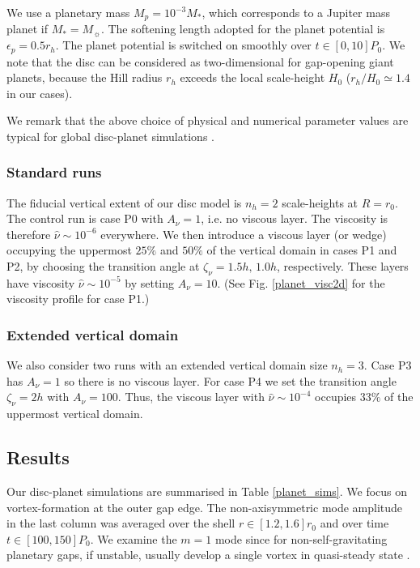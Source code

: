 We use a planetary mass 
$M_p=10^{-3}M_*$, which corresponds to a Jupiter mass planet if
$M_*=M_{\sun}$. The softening length adopted for the planet potential is
$\epsilon_p=0.5r_h$. The planet potential is switched on 
smoothly over $t\in[0,10]P_0$. We note that the disc can be considered
as two-dimensional for gap-opening giant planets, because the Hill
radius $r_h$ exceeds the local scale-height $H_0$ ($r_h/H_0\simeq1.4$
in our cases).   

We remark that the above choice of physical and numerical parameter
values are typical for global disc-planet simulations
\citep[e.g.][]{valborro06,mignone12}.  


\subsubsection{Standard runs} 
The fiducial vertical extent of our disc model is $n_h=2$
scale-heights at $R=r_0$.  The control run is case P0 with $A_\nu=1$,
i.e. no viscous layer. The viscosity is therefore
$\hat{\nu}\sim10^{-6}$  everywhere. We then introduce a viscous
layer (or wedge) occupying the uppermost $25\%$ and $50\%$ of the
vertical domain in cases P1 and P2, by choosing the transition angle
at $\zeta_\nu = 1.5h,\,1.0h$, respectively. These layers have
viscosity $\hat{\nu}\sim 10^{-5}$ by setting $A_\nu=10$.  (See
Fig. \ref{planet_visc2d} for the viscosity profile for case P1.)  

\subsubsection{Extended vertical domain}
We also consider two runs with an extended vertical domain size
$n_h=3$. Case P3 has $A_\nu=1$ so there is no viscous layer. For case
P4 we set the transition angle $\zeta_\nu=2h$ with $A_\nu=100$. 
Thus, the viscous layer with $\hat{\nu}\sim10^{-4}$ occupies $33\%$ of
the uppermost vertical domain.    




\subsection{Results}
Our disc-planet simulations are summarised in Table \ref{planet_sims}.
We focus on vortex-formation at the outer gap edge. 
The non-axisymmetric mode amplitude in the last column was 
averaged over the shell $r\in[1.2,1.6]r_0$ and over time 
$t\in[100,150]P_0$. We examine the $m=1$ mode since 
for non-self-gravitating planetary gaps, if unstable, usually develop
a single vortex in quasi-steady state \citep{valborro07,lin10}.   

